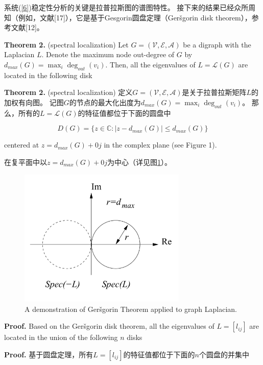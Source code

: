 \documentclass{article}
\begin{document}
系统(\ref{6})稳定性分析的关键是拉普拉斯图的谱图特性。
接下来的结果已经众所周知（例如，文献[17]），它是基于Gesgorin圆盘定理（Ger\v sgorin disk theorem），参考文献[12]。

{\color[gray]{0.5}
\noindent \textbf{Theorem 2.} (spectral localization) Let $G=(\mathcal{V},\mathcal{E},\mathcal{A})$ be a digraph with the Laplacian $L$. 
Denote the maximum node out-degree of $G$ by $d_{max}(G) = \max_i \deg_{out}(v_i)$. 
Then, all the eigenvalues of $L=\mathcal{L}(G)$ are located in the following disk
}

\noindent \textbf{Theorem 2.} (spectral localization) 定义$G=(\mathcal{V},\mathcal{E},\mathcal{A})$是关于拉普拉斯矩阵$L$的加权有向图。
记图$G$的节点的最大化出度为$d_{max}(G) = \max_i \deg_{out}(v_i)$。
那么，所有的$L=\mathcal{L}(G)$的特征值都位于下面的圆盘中

\begin{equation}
    D(G) = \{ z\in \mathbb{C}: |z-d_{max}(G)| \le d_{max}(G) \}
    \tag{15}
    \label{15}
\end{equation}

{\color[gray]{0.5}
\noindent centered at $z=d_{max}(G)+0j$ in the complex plane (see Figure 1).
}

\noindent 在复平面中以$z=d_{max}(G)+0j$为中心（详见图\ref{DiskTheorem}）。

\begin{figure}[htbp]
    \centering
    \includegraphics[width=8cm]{figures/Fig1-DiskTheorem.jpeg}
    \caption{A demonstration of Ger\v sgorin Theorem applied to graph Laplacian.}
    \label{DiskTheorem}
\end{figure}

{\color[gray]{0.5}
\noindent \textbf{Proof.}  Based on the Ger\v sgorin disk theorem, all the eigenvalues of $L=[l_{ij}]$ are located in the union of the following $n$ disks
}

\noindent \textbf{Proof.} 基于圆盘定理，所有$L=[l_{ij}]$的特征值都位于下面的$n$个圆盘的并集中
\end{document}
